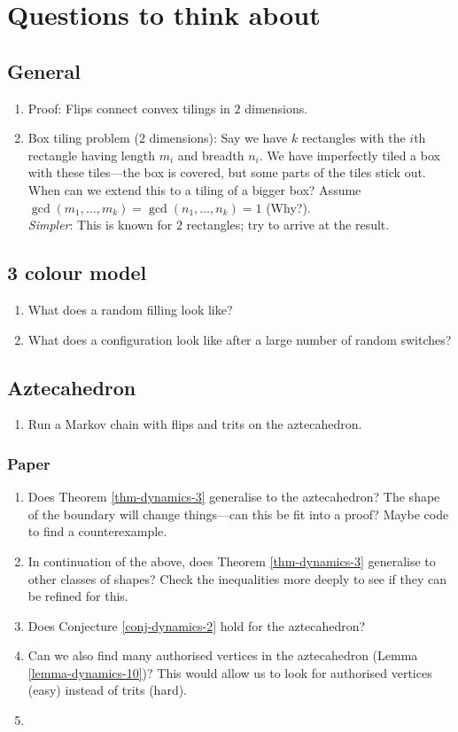 \chapter{Questions to think about}

\section{General}
\begin{enumerate}
	\item Proof: Flips connect convex tilings in $2$ dimensions.
	\item Box tiling problem ($2$ dimensions): Say we have $k$ rectangles with the $i$th rectangle having length $m_i$ and breadth $n_i$. We have imperfectly tiled a box with these tiles---the box is covered, but some parts of the tiles stick out. When can we extend this to a tiling of a bigger box? Assume $\gcd(m_1,\dots,m_k) = \gcd(n_1,\dots,n_k) = 1$ (Why?).\\ \textit{Simpler}: This is known for $2$ rectangles; try to arrive at the result. 
\end{enumerate}
\section{3 colour model}
\begin{enumerate}
	\item What does a random filling look like?
	\item What does a configuration look like after a large number of random switches?
\end{enumerate}

\section{Aztecahedron}

\begin{enumerate}
	\item Run a Markov chain with flips and trits on the aztecahedron.
\end{enumerate}

\subsection{Paper \cite{hartarsky2023local}}
\begin{enumerate}
	\item Does Theorem \ref{thm-dynamics-3} generalise to the aztecahedron? The shape of the boundary will change things---can this be fit into a proof? Maybe code to find a counterexample.
	\item In continuation of the above, does Theorem \ref{thm-dynamics-3} generalise to other classes of shapes? Check the inequalities more deeply to see if they can be refined for this.
	\item Does Conjecture \ref{conj-dynamics-2} hold for the aztecahedron?
	\item Can we also find many authorised vertices in the aztecahedron (Lemma \ref{lemma-dynamics-10})? This would allow us to look for authorised vertices (easy) instead of trits (hard). 
	\item 
\end{enumerate}

